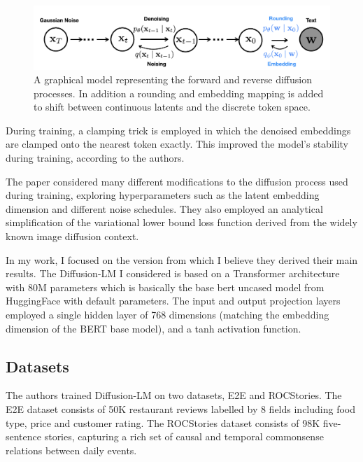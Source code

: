 \begin{figure}[h]
\includegraphics[scale=0.3]{images/diffusion-lm-graphical-model.png}
\centering
\caption{A graphical model representing the forward and reverse diffusion processes. In addition a rounding and embedding mapping is added to shift between continuous latents and the discrete token space.}
\label{fig:graphical-model}
\end{figure}

During training, a clamping trick is employed in which the denoised embeddings are clamped onto the nearest token exactly. This improved the model's stability during training, according to the authors.

The paper considered many different modifications to the diffusion process used during training, exploring hyperparameters such as the latent embedding dimension and different noise schedules. They also employed an analytical simplification of the variational lower bound loss function derived from the widely known image diffusion context.

In my work, I focused on the version from which I believe they derived their main results. The Diffusion-LM I considered is based on a Transformer architecture with 80M parameters which is basically the base bert uncased model from HuggingFace with default parameters. The input and output projection layers employed a single hidden layer of 768 dimensions (matching the embedding dimension of the BERT base model), and a tanh activation function.

\subsection{Datasets}


The authors trained Diffusion-LM on two datasets, E2E and ROCStories. The E2E dataset consists of 50K restaurant reviews labelled by 8 fields including food type, price and customer rating. The ROCStories dataset consists of 98K five-sentence stories, capturing a rich set of causal and temporal commonsense relations between daily events.

